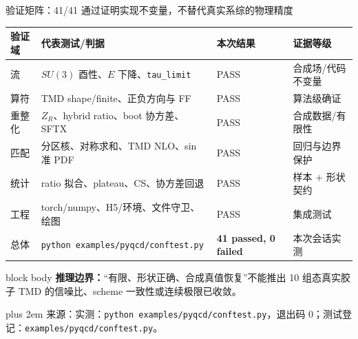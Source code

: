 \documentclass[UTF8,aspectratio=169,11pt]{ctexbeamer}
\renewcommand{\arraystretch}{0.92}
\newcommand{\source}[1]{%
  \par\vspace{0.02em}\begingroup\fontsize{6}{6.8}\selectfont\raggedright\sloppy
  \setlength{\emergencystretch}{3em}\rightskip=0pt plus 2em
  \color{muted}来源：#1\par\endgroup}
\begin{document}
\begin{frame}[t]{验证矩阵：41/41 通过证明实现不变量，不替代真实系综的物理精度}
  \footnotesize
  \renewcommand{\arraystretch}{0.82}
  \begin{tabularx}{0.98\textwidth}{@{}p{}Yp{0.22\textwidth}Y@{}}
    \toprule
    验证域 & 代表测试/判据 & 本次结果 & 证据等级\\
    \midrule
    流 & \(SU(3)\) 酉性、\(E\) 下降、\texttt{tau\_limit} & PASS & 合成场/代码不变量\\
    算符 & TMD shape/finite、正负方向与 FF & PASS & 算法级确证\\
    重整化 & \(Z_R\)、hybrid ratio、boot 协方差、SFTX & PASS & 合成数据/有限性\\
    匹配 & 分区核、对称求和、TMD NLO、sin 准 PDF & PASS & 回归与边界保护\\
    统计 & ratio 拟合、plateau、CS、协方差回退 & PASS & 样本 + 形状契约\\
    工程 & torch/numpy、H5/环境、文件守卫、绘图 & PASS & 集成测试\\
    总体 & \nolinkurl{python examples/pyqcd/conftest.py} & \textbf{41 passed, 0 failed} & 本次会话实测\\
    \bottomrule
  \end{tabularx}
  \vspace{0.1em}
  \begin{beamercolorbox}[wd=0.98\textwidth,sep=0.18em,rounded=true]{block body}
    \scriptsize\textbf{推理边界：}“有限、形状正确、合成真值恢复”不能推出
    10 组态真实胶子 TMD 的信噪比、scheme 一致性或连续极限已收敛。
  \end{beamercolorbox}
  \source{实测：\texttt{python examples/pyqcd/conftest.py}，退出码 0；测试登记：\nolinkurl{examples/pyqcd/conftest.py}。}
\end{frame}
\end{document}
